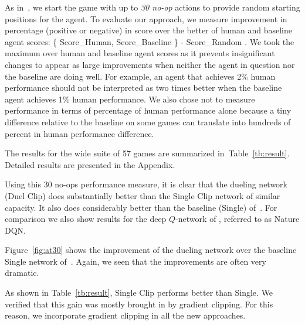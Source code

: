 
As in~\cite{vanHasselt:2015}, 
we start the game with up to \emph{30 no-op} actions to provide random starting positions for the agent.
To evaluate our approach, we measure improvement in percentage (positive or negative) 
in score over the better of human and baseline agent scores: 
\be
\label{eq:metric}
{\footnotesize
{}
	{\small
		\max\{
			\mbox{Score}_{\mbox{\tiny Human}}, \mbox{Score}_{\mbox{\tiny Baseline}} 
		 \}
	-  \mbox{Score}_{\mbox{\tiny Random}}
	}.
}
\ee
We took the maximum over human and baseline agent scores as it prevents insignificant 
changes to appear as large improvements 
when neither the agent in question nor the baseline are doing well.
For example, an agent that achieves 2\% human performance should not be interpreted 
as two times better when the baseline agent achieves 1\% human performance.
We also chose not to measure performance in terms of percentage of human performance alone
because a tiny difference relative to the baseline on some games can translate into hundreds of
percent in human performance difference.


The results for the wide suite of 57 games are summarized in~Table~\ref{tb:result}. Detailed results are presented in the Appendix.

Using this 30 no-ops performance measure, it is clear that the dueling network (Duel Clip) does substantially better than the Single Clip network of similar capacity. It also does considerably better than the baseline (Single) of~\citet{vanHasselt:2015}. For comparison we also show results for the deep $Q$-network of \citet{Mnih:2015}, referred to as Nature DQN.






Figure~\ref{fig:at30} shows the improvement of the dueling network over the baseline Single network of~\citet{vanHasselt:2015}. Again, we seen that the improvements are often very dramatic.


As shown in Table~\ref{tb:result}, Single Clip performs better than Single. We verified that this gain was mostly brought in by gradient clipping. For this reason, we incorporate gradient clipping in all the new approaches.  






